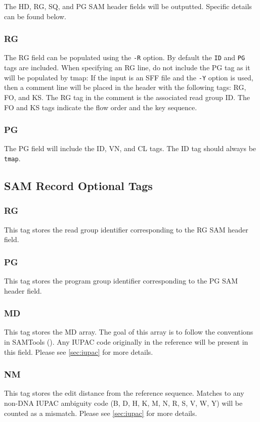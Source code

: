 \documentclass[a4paper,12pt]{book}
\newcommand{\TT}[1]{{\tt #1}} %
\begin{document}
The HD, RG, SQ, and PG SAM header fields will be outputted.
Specific details can be found below.

\subsubsection{RG}
The RG field can be populated using the \TT{-R} option.
By default the \TT{ID} and \TT{PG} tags are included.
When specifying an RG line, do not include the PG tag as it will be populated by tmap:
If the input is an SFF file and the \TT{-Y} option is used, then a comment line will be placed in the header with the following tags:
RG, FO, and KS.
The RG tag in the comment is the associated read group ID.
The FO and KS tags indicate the flow order and the key sequence.

\subsubsection{PG}
The PG field will include the ID, VN, and CL tags.
The ID tag should always be \TT{tmap}.

\subsection{SAM Record Optional Tags}

\subsubsection{RG}
This tag stores the read group identifier corresponding to the RG SAM header field.

\subsubsection{PG}
This tag stores the program group identifier corresponding to the PG SAM header field.

\subsubsection{MD}
This tag stores the MD array.
The goal of this array is to follow the conventions in SAMTools (\cite{SAM-format}).
Any IUPAC code originally in the reference will be present in this field.
Please see \autoref{sec:iupac} for more details. 

\subsubsection{NM}
This tag stores the edit distance from the reference sequence.
Matches to any non-DNA IUPAC ambiguity code (B, D, H, K, M, N, R, S, V, W, Y) will be counted as a mismatch.
Please see \autoref{sec:iupac} for more details. 
\end{document}
